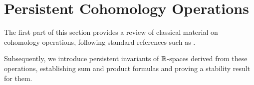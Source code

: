 
\section{Persistent Cohomology Operations}\label{s:steenrod}

The first part of this section provides a review of classical material on cohomology operations, following standard references such as \cite{steenrod1962cohomology, mosheroperations1968, may1970general}.

Subsequently, we introduce persistent invariants of \(\mathbb{R}\)-spaces derived from these operations, establishing sum and product formulas and proving a stability result for them.




